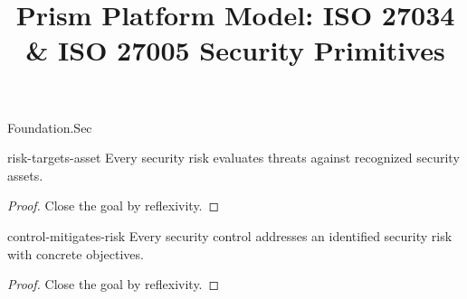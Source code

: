 \begin{lexlean}{Foundation.Sec}
\title{Prism Platform Model: ISO 27034 & ISO 27005 Security Primitives}

\begin{theorem}{risk-targets-asset}
\noaxioms
Every security risk evaluates threats against recognized security assets.
\begin{proof}
Close the goal by reflexivity.
\end{proof}
\end{theorem}

\begin{theorem}{control-mitigates-risk}
\noaxioms
Every security control addresses an identified security risk with concrete objectives.
\begin{proof}
Close the goal by reflexivity.
\end{proof}
\end{theorem}

\end{lexlean}

